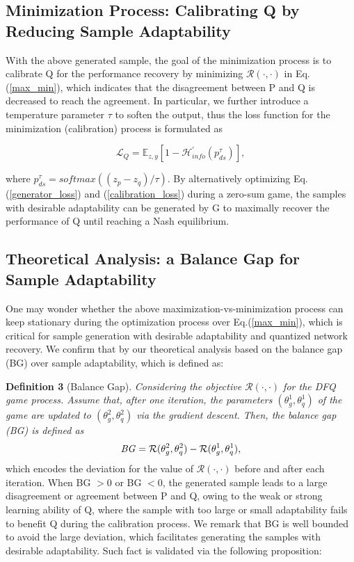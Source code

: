 \subsection{Minimization Process: Calibrating Q by Reducing Sample Adaptability}
\label{shrinking_stage}
With the above generated sample, the goal of the minimization process is to calibrate Q for the performance recovery by minimizing $\mathcal{R}(\cdot,\cdot)$ in Eq.(\ref{max_min}), which indicates that the disagreement between P and Q is decreased to reach the agreement.
In particular, we further introduce a temperature parameter $\tau$ to soften the output, thus the loss function for the minimization (calibration) process is formulated as 
\begin{small}
\begin{equation}
\mathcal{L}_Q=\mathbb{E}_{z,y}[1-\mathcal{H}_{info}^{'}(p_{ds}^{\tau})],
\label{calibration_loss}
\end{equation}
\end{small}
where $p_{ds}^{\tau}=softmax((z_p-z_q)/\tau)$. 
By alternatively optimizing Eq.(\ref{generator_loss}) and (\ref{calibration_loss}) during a zero-sum game, the samples with desirable adaptability can be generated by G to maximally recover the performance of Q until reaching a Nash equilibrium.  






\subsection{Theoretical Analysis: a Balance Gap for Sample Adaptability}
One may wonder whether the above maximization-vs-minimization process can keep stationary during the optimization process over Eq.(\ref{max_min}), which is critical for sample generation with desirable adaptability and quantized network recovery.  We confirm that by our theoretical analysis based on the balance gap (BG) over sample adaptability, which is defined as:

\noindent \textbf{Definition 3} (Balance Gap). \emph{Considering the objective $\mathcal{R}(\cdot,\cdot)$ for the DFQ game process. Assume that, after one iteration, the  parameters $(\theta_g^1,\theta_q^1)$ of the game are updated to $(\theta^2_g,\theta_q^2)$ via the gradient descent. Then, the balance gap (BG) is defined as}
\begin{equation}
\text{\emph{BG}} =\mathcal{R}(\theta^2_g,\theta^2_q)-\mathcal{R}(\theta_g^1,\theta_q^1),
\label{}
\end{equation}
which encodes the deviation for the value of $\mathcal{R}(\cdot,\cdot)$ before and after each iteration. When BG $>0$ or BG $<0$, the generated sample leads to a large disagreement or agreement  between P and Q, owing to the weak or strong learning ability of Q, where the  sample with too large or small adaptability fails to benefit Q during the calibration process.
We remark that BG is well bounded to avoid the large deviation, which facilitates generating the samples with desirable adaptability.
Such fact is validated via the following proposition:



